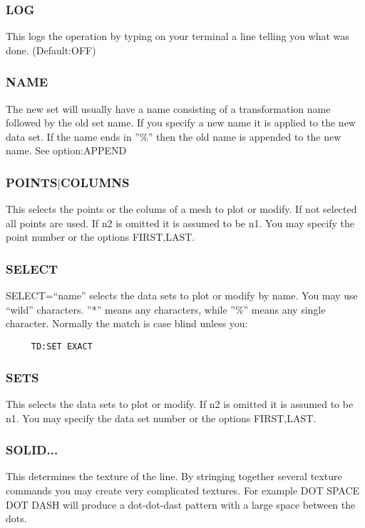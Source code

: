 \subsubsection{LOG}
This  logs  the operation by typing on your terminal a line telling you
what was done.  
(Default:OFF) 
\subsubsection{NAME}
The  new  set  will  usually have a name consisting of a transformation
name followed by the old set name.  If you specify a  new  name  it  is
applied to the new data set.  If the name ends in ''\%'' then the old name
is appended to the new name.  See option:APPEND 
\subsubsection{POINTS$|$COLUMNS}
This  selects the points or the colums of a mesh to plot or modify.  If
not selected all points are used.  If n2 is omitted it is assumed to be
n1.  You may specify the point number or the options FIRST,LAST.  
\subsubsection{SELECT}
SELECT=``name''
selects  the  data  sets to plot or modify by name.  You may use ``wild''
characters.  ''*'' means any  characters,  while  ''\%''  means  any  single
character.  Normally the match is case blind unless you:  
\begin{verbatim}
     TD:SET EXACT 
\end{verbatim}
\subsubsection{SETS}
This  selects  the data sets to plot or modify.  If n2 is omitted it is
assumed to be n1.  You may specify the data set number or  the  options
FIRST,LAST.  
\subsubsection{SOLID...}
This determines the texture of the line.  By stringing together several
texture commands you may create very complicated textures.  For example
DOT  SPACE  DOT  DASH  will produce a dot-dot-dast pattern with a large
space between the dots.  

